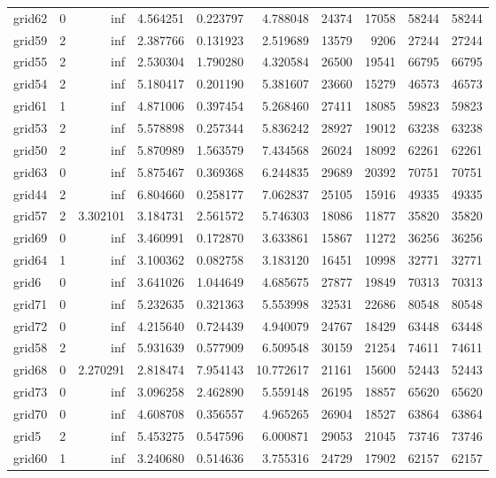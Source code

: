 \begin{longtable}{|l|r|r|r|r|r|r|r|r|r|}
grid62 & 0 & inf & 4.564251 & 0.223797 & 4.788048 & 24374 & 17058 & 58244 & 58244 \\
grid59 & 2 & inf & 2.387766 & 0.131923 & 2.519689 & 13579 & 9206 & 27244 & 27244 \\
grid55 & 2 & inf & 2.530304 & 1.790280 & 4.320584 & 26500 & 19541 & 66795 & 66795 \\
grid54 & 2 & inf & 5.180417 & 0.201190 & 5.381607 & 23660 & 15279 & 46573 & 46573 \\
grid61 & 1 & inf & 4.871006 & 0.397454 & 5.268460 & 27411 & 18085 & 59823 & 59823 \\
grid53 & 2 & inf & 5.578898 & 0.257344 & 5.836242 & 28927 & 19012 & 63238 & 63238 \\
grid50 & 2 & inf & 5.870989 & 1.563579 & 7.434568 & 26024 & 18092 & 62261 & 62261 \\
grid63 & 0 & inf & 5.875467 & 0.369368 & 6.244835 & 29689 & 20392 & 70751 & 70751 \\
grid44 & 2 & inf & 6.804660 & 0.258177 & 7.062837 & 25105 & 15916 & 49335 & 49335 \\
grid57 & 2 & 3.302101 & 3.184731 & 2.561572 & 5.746303 & 18086 & 11877 & 35820 & 35820 \\
grid69 & 0 & inf & 3.460991 & 0.172870 & 3.633861 & 15867 & 11272 & 36256 & 36256 \\
grid64 & 1 & inf & 3.100362 & 0.082758 & 3.183120 & 16451 & 10998 & 32771 & 32771 \\
grid6 & 0 & inf & 3.641026 & 1.044649 & 4.685675 & 27877 & 19849 & 70313 & 70313 \\
grid71 & 0 & inf & 5.232635 & 0.321363 & 5.553998 & 32531 & 22686 & 80548 & 80548 \\
grid72 & 0 & inf & 4.215640 & 0.724439 & 4.940079 & 24767 & 18429 & 63448 & 63448 \\
grid58 & 2 & inf & 5.931639 & 0.577909 & 6.509548 & 30159 & 21254 & 74611 & 74611 \\
grid68 & 0 & 2.270291 & 2.818474 & 7.954143 & 10.772617 & 21161 & 15600 & 52443 & 52443 \\
grid73 & 0 & inf & 3.096258 & 2.462890 & 5.559148 & 26195 & 18857 & 65620 & 65620 \\
grid70 & 0 & inf & 4.608708 & 0.356557 & 4.965265 & 26904 & 18527 & 63864 & 63864 \\
grid5 & 2 & inf & 5.453275 & 0.547596 & 6.000871 & 29053 & 21045 & 73746 & 73746 \\
grid60 & 1 & inf & 3.240680 & 0.514636 & 3.755316 & 24729 & 17902 & 62157 & 62157 \\

\end{longtable}
